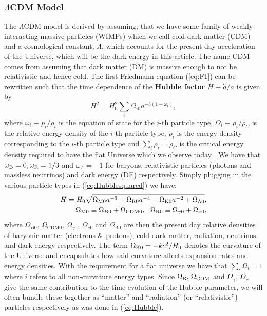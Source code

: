 \documentclass[%
reprint,
 amsmath,amssymb,
 aps,
]{revtex4-2}
\begin{document}
\subsubsection{$\Lambda$CDM Model}
The $\Lambda$CDM model is derived by assuming; that we have some family of weakly interacting massive particles (WIMPs) which we call cold-dark-matter (CDM) and a cosmological constant, $\Lambda$, which accounts for the present day acceleration of the Universe, which will be the dark energy in this article. The name CDM comes from assuming that dark matter (DM) is massive enough to not be relativistic and hence cold. 
The first Friedmann equation (\ref{eq:F1}) can be rewritten such that the time dependence of the \textbf{Hubble factor} $H\equiv\dot{a}/a$ is given by
\begin{equation}
	H^2=H_0^2\sum_i\Omega_{i0}a^{-3(1+\omega_i)},
	\label{eq:Hubblesquared}
\end{equation}
where $\omega_i\equiv p_i/\rho_i$ is the equation of state for the $i$-th particle type, $\Omega_i\equiv\rho_i/\rho_C$ is the relative energy density of the $i$-th particle type, $\rho_i$ is the energy density corresponding to the $i$-th particle type and $\sum_i\rho_i=\rho_C$ is the critical energy density required to have the flat Universe which we observe today \cite{Planck:2018vyg}. We have that $\omega_{\text B}=0,\omega_{\text{R}}=1/3$ and $\omega_\Lambda=-1$ for baryons, relativistic particles (photons and massless neutrinos) and dark energy (DE) respectively. Simply plugging in the various particle types in (\ref{eq:Hubblesquared}) we have:
\begin{align}
	H=H_0\sqrt{\Omega_{\text M0}a^{-3}+\Omega_{\text{R}0}a^{-4}+\Omega_{\text K0}a^{-2}+\Omega_{\Lambda0}}, 
	\label{eq:Hubble}\\
	\Omega_{\text M0}\equiv \Omega_{B0}+\Omega_{\text{CDM}0},~~\Omega_{\text{R}0}\equiv \Omega_{\gamma0}+\Omega_{\nu0},\nonumber
\end{align}
where $\Omega_{B0},\,\Omega_{\text{CDM}0},\,\Omega_{\gamma0},\,\Omega_{\nu0}$ and $\Omega_{\Lambda0}$ are then the present day relative densities of baryonic matter (electrons \& protons), cold dark matter, radiation, neutrinos and dark energy respectively. The term $\Omega_{\text K0}=-kc^2/H_0$ denotes the curvature of the Universe and encapsulates how said curvature affects expansion rates and energy densities. With the requirement for a flat universe we have that $\sum_i\Omega_i=1$ where $i$ refers to all non-curvature energy types. Since $\Omega_{\text B},\,\Omega_{\text{CDM}}$ and $\Omega_\gamma,\,\Omega_\nu$ give the same contribution to the time evolution of the Hubble parameter, we will often bundle these together as ``matter'' and ``radiation'' (or ``relativistic'') particles respectively as was done in (\ref{eq:Hubble}).
\end{document}
